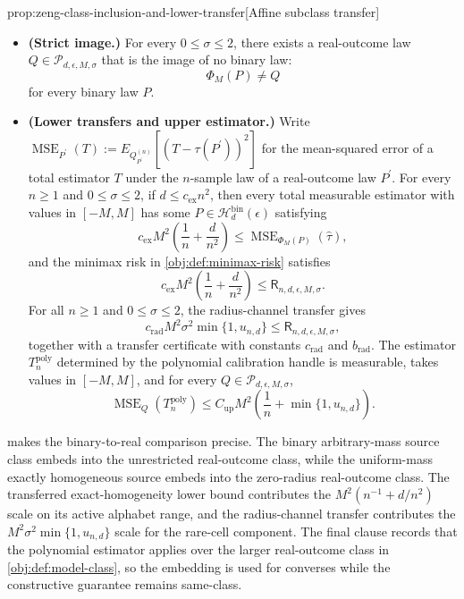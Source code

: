 \documentclass[11pt]{article}
\begin{document}
\begin{propositionv}{prop:zeng-class-inclusion-and-lower-transfer}[Affine subclass transfer]
\begin{itemize}
\item \textbf{(Strict image.)} For every \(0\le\sigma\le2\), there exists a real-outcome law \(Q\in\mathcal P_{d,\epsilon,M,\sigma}\) that is the image of no binary law:
\[
\Phi_M(P)\ne Q
\]
for every binary law \(P\).

\item \textbf{(Lower transfers and upper estimator.)} Write \(\operatorname{MSE}_{P^{\prime}}(T):=E_{Q_{P^{\prime}}^{(n)}}\left[\left(T-\tau(P^{\prime})\right)^2\right]\) for the mean-squared error of a total estimator \(T\) under the \(n\)-sample law of a real-outcome law \(P^{\prime}\). For every \(n\ge1\) and \(0\le\sigma\le2\), if \(d\le c_{\mathrm{ex}}n^2\), then every total measurable estimator with values in \([-M,M]\) has some \(P\in\mathcal H_d^{\mathrm{bin}}(\epsilon)\) satisfying
\[
c_{\mathrm{ex}}M^2\left(\frac1n+\frac{d}{n^2}\right)
\le
\operatorname{MSE}_{\Phi_M(P)}(\widehat\tau),
\]
and the minimax risk in \cref{obj:def:minimax-risk} satisfies
\[
c_{\mathrm{ex}}M^2\left(\frac1n+\frac{d}{n^2}\right)
\le
\mathsf R_{n,d,\epsilon,M,\sigma}.
\]
For all \(n\ge1\) and \(0\le\sigma\le2\), the radius-channel transfer gives
\[
c_{\mathrm{rad}}M^2\sigma^2\min\{1,u_{n,d}\}
\le
\mathsf R_{n,d,\epsilon,M,\sigma},
\]
together with a transfer certificate with constants \(c_{\mathrm{rad}}\) and \(b_{\mathrm{rad}}\).  The estimator \(T_n^{\mathrm{poly}}\) determined by the polynomial calibration handle is measurable, takes values in \([-M,M]\), and for every \(Q\in\mathcal P_{d,\epsilon,M,\sigma}\),
\[
\operatorname{MSE}_{Q}(T_n^{\mathrm{poly}})
\le
C_{\mathrm{up}}M^2\left(\frac1n+\min\{1,u_{n,d}\}\right).
\]
\end{itemize}
\end{propositionv}

 makes the binary-to-real comparison precise. The binary arbitrary-mass source class embeds into the unrestricted real-outcome class, while the uniform-mass exactly homogeneous source embeds into the zero-radius real-outcome class. The transferred exact-homogeneity lower bound contributes the \(M^2(n^{-1}+d/n^2)\) scale on its active alphabet range, and the radius-channel transfer contributes the \(M^2\sigma^2\min\{1,u_{n,d}\}\) scale for the rare-cell component. The final clause records that the polynomial estimator applies over the larger real-outcome class in \cref{obj:def:model-class}, so the embedding is used for converses while the constructive guarantee remains same-class.
\end{document}
